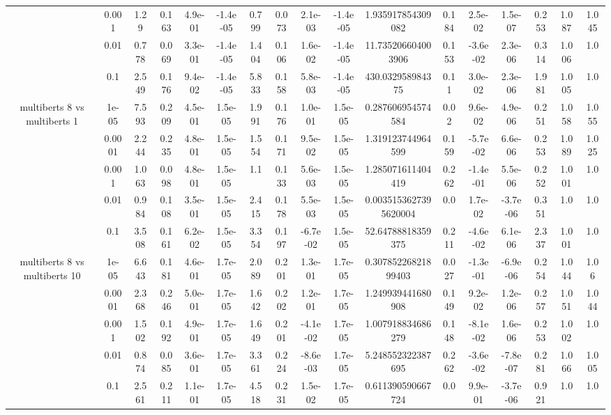 \begin{tabular}{|c|c|c|c|c|c|c|c|c|c|c|c|c|c|c|c|c|}
 & 0.001 & 1.29 & 0.163 & 4.9e-01 & -1.4e-05 & 0.799 & 0.073 & 2.1e-03 & -1.4e-05 & 1.935917854309082 & 0.184 & 2.5e-02 & 1.5e-07 & 0.253 & 1.087 & 1.045 \\
 & 0.01 & 0.778 & 0.069 & 3.3e-01 & -1.4e-05 & 1.404 & 0.106 & 1.6e-02 & -1.4e-05 & 11.735206604003906 & 0.153 & -3.6e-02 & 2.3e-06 & 0.314 & 1.006 & 1.0 \\
 & 0.1 & 2.549 & 0.176 & 9.4e-02 & -1.4e-05 & 5.833 & 0.158 & 5.8e-03 & -1.4e-05 & 430.032958984375 & 0.11 & 3.0e-02 & 2.3e-06 & 1.981 & 1.005 & 1.0 \\
\hline
\multirow{5}{*}{multiberts 8 vs multiberts 1} & 1e-05 & 7.593 & 0.209 & 4.5e-01 & 1.5e-05 & 1.991 & 0.176 & 1.0e-01 & 1.5e-05 & 0.287606954574584 & 0.02 & 9.6e-02 & 4.9e-06 & 0.251 & 1.058 & 1.055 \\
 & 0.0001 & 2.244 & 0.235 & 4.8e-01 & 1.5e-05 & 1.554 & 0.171 & 9.5e-02 & 1.5e-05 & 1.319123744964599 & 0.159 & -5.7e-02 & 6.6e-06 & 0.253 & 1.089 & 1.025 \\
 & 0.001 & 1.063 & 0.098 & 4.8e-01 & 1.5e-05 & 1.1 & 0.133 & 5.6e-03 & 1.5e-05 & 1.285071611404419 & 0.262 & -1.4e-01 & 5.5e-06 & 0.252 & 1.001 & 1.0 \\
 & 0.01 & 0.984 & 0.108 & 3.5e-01 & 1.5e-05 & 2.415 & 0.178 & 5.5e-03 & 1.5e-05 & 0.0035153627395620004 & 0.0 & 1.7e-02 & -3.7e-06 & 0.351 & 1.0 & 1.0 \\
 & 0.1 & 3.508 & 0.161 & 6.2e-02 & 1.5e-05 & 3.354 & 0.197 & -6.7e-02 & 1.5e-05 & 52.64788818359375 & 0.211 & -4.6e-02 & 6.1e-06 & 2.337 & 1.001 & 1.0 \\
\hline
\multirow{5}{*}{multiberts 8 vs multiberts 10} & 1e-05 & 6.643 & 0.181 & 4.6e-01 & 1.7e-05 & 2.089 & 0.201 & 1.3e-01 & 1.7e-05 & 0.30785226821899403 & 0.027 & -1.3e-01 & -6.9e-06 & 0.254 & 1.044 & 1.06 \\
 & 0.0001 & 2.368 & 0.246 & 5.0e-01 & 1.7e-05 & 1.642 & 0.202 & 1.2e-01 & 1.7e-05 & 1.249939441680908 & 0.149 & 9.2e-02 & 1.2e-06 & 0.257 & 1.051 & 1.044 \\
 & 0.001 & 1.502 & 0.192 & 4.9e-01 & 1.7e-05 & 1.649 & 0.201 & -4.1e-02 & 1.7e-05 & 1.007918834686279 & 0.148 & -8.1e-02 & 1.6e-06 & 0.253 & 1.002 & 1.0 \\
 & 0.01 & 0.874 & 0.085 & 3.6e-01 & 1.7e-05 & 3.361 & 0.224 & -8.6e-03 & 1.7e-05 & 5.248552322387695 & 0.262 & -3.6e-02 & -7.8e-07 & 0.281 & 1.066 & 1.005 \\
 & 0.1 & 2.561 & 0.211 & 1.1e-01 & 1.7e-05 & 4.518 & 0.231 & 1.5e-02 & 1.7e-05 & 0.611390590667724 & 0.0 & 9.9e-01 & -3.7e-06 & 0.921 & 1.0 & 1.0 \\

\end{tabular}
